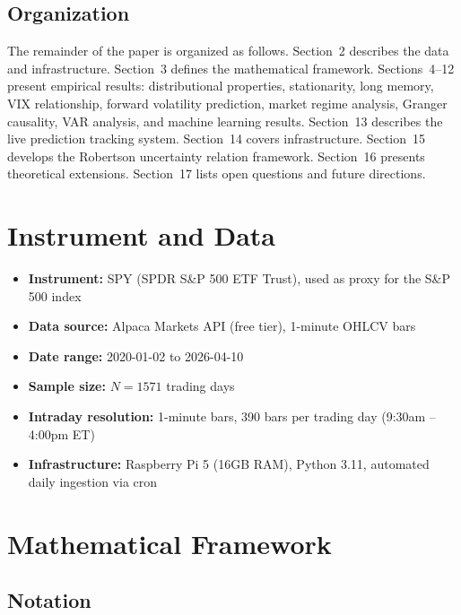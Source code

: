 \documentclass[preprint,12pt]{elsarticle}
\begin{document}
\subsection{Organization}

The remainder of the paper is organized as follows. Section~2 describes the data and infrastructure. Section~3 defines the mathematical framework. Sections~4--12 present empirical results: distributional properties, stationarity, long memory, VIX relationship, forward volatility prediction, market regime analysis, Granger causality, VAR analysis, and machine learning results. Section~13 describes the live prediction tracking system. Section~14 covers infrastructure. Section~15 develops the Robertson uncertainty relation framework. Section~16 presents theoretical extensions. Section~17 lists open questions and future directions.

\section{Instrument and Data}

\begin{itemize}
    \item \textbf{Instrument:} SPY (SPDR S\&P 500 ETF Trust), used as proxy for the S\&P 500 index
    \item \textbf{Data source:} Alpaca Markets API (free tier), 1-minute OHLCV bars
    \item \textbf{Date range:} 2020-01-02 to 2026-04-10
    \item \textbf{Sample size:} $N = 1571$ trading days
    \item \textbf{Intraday resolution:} 1-minute bars, 390 bars per trading day (9:30am -- 4:00pm ET)
    \item \textbf{Infrastructure:} Raspberry Pi 5 (16GB RAM), Python 3.11, automated daily ingestion via cron
\end{itemize}

\section{Mathematical Framework}

\subsection{Notation}
\end{document}
